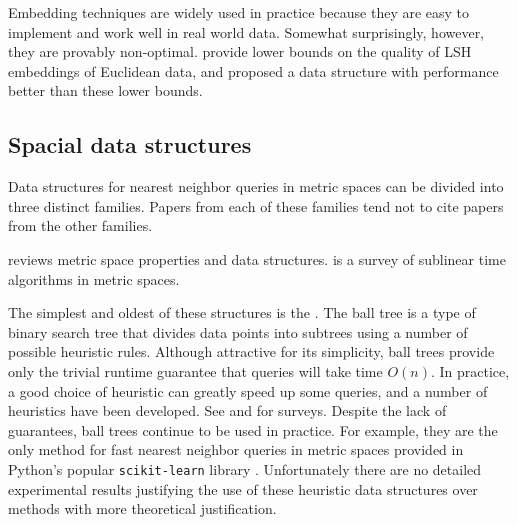\documentclass[thesis.tex]{subfiles}
\begin{document}
Embedding techniques are widely used in practice because they are easy to implement and work well in real world data.
Somewhat surprisingly, however, they are provably non-optimal.
\cite{o2014optimal} provide lower bounds on the quality of LSH embeddings of Euclidean data,
and \cite{andoni2014beyond} proposed a data structure with performance better than these lower bounds.


\subsection{Spacial data structures}

Data structures for nearest neighbor queries in metric spaces can be divided into three distinct families. 
Papers from each of these families tend not to cite papers from the other families.

\cite{clarkson2006nearest} reviews metric space properties and data structures.
\cite{czumaj2010sublinear} is a survey of sublinear time algorithms in metric spaces.

The simplest and oldest of these structures is the  \citep{omohundro1989}.
The ball tree is a type of binary search tree that divides data points into subtrees using a number of possible heuristic rules.
Although attractive for its simplicity, 
ball trees provide only the trivial runtime guarantee that queries will take time $O(n)$.
In practice, a good choice of heuristic can greatly speed up some queries,
and a number of heuristics have been developed.
See \cite{zezula2006similarity} and \cite{mao2016pivot} for surveys.
Despite the lack of guarantees,
ball trees continue to be used in practice.
For example, they are the only method for fast nearest neighbor queries in metric spaces provided in Python's popular \texttt{scikit-learn} library \citep{scikit-learn}.
Unfortunately there are no detailed experimental results justifying the use of these heuristic data structures over methods with more theoretical justification.
\end{document}
